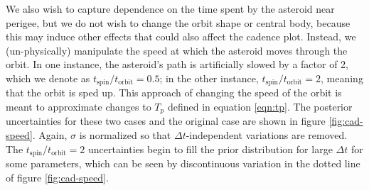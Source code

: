\documentclass[fleqn,usenatbib]{mnras}
\begin{document}
We also wish to capture dependence on the time spent by the asteroid near perigee, but we do not wish to change the orbit shape or central body, because this may induce other effects that could also affect the cadence plot. Instead, we (un-physically) manipulate the speed at which the asteroid moves through the orbit. In one instance, the asteroid's path is artificially slowed by a factor of 2, which we denote as $t_\text{spin}/t_\text{orbit}=0.5$; in the other instance, $t_\text{spin}/t_\text{orbit}=2$, meaning that the orbit is sped up. This approach of changing the speed of the orbit is meant to approximate changes to $T_p$ defined in equation \ref{eqn:tp}. The posterior uncertainties for these two cases and the original case are shown in figure \ref{fig:cad-speed}. Again, $\sigma$ is normalized so that $\Delta t$-independent variations are removed. The $t_\text{spin}/t_\text{orbit}=2$ uncertainties begin to fill the prior distribution for large $\Delta t$ for some parameters, which can be seen by discontinuous variation in the dotted line of figure \ref{fig:cad-speed}.
\end{document}
